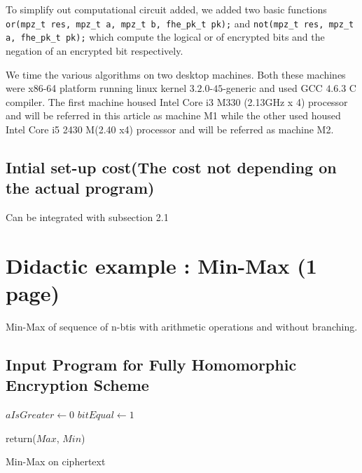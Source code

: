 \documentclass{acm_proc_article-sp}
\begin{document}
To simplify out computational circuit added, we added two basic functions \texttt{or(mpz\_t res, mpz\_t a, mpz\_t b, fhe\_pk\_t pk);} and \texttt{not(mpz\_t res, mpz\_t a, fhe\_pk\_t pk);} which compute the logical or of encrypted bits and the negation of an encrypted bit respectively.

We time the various algorithms on two desktop machines. Both these machines were x86-64 platform running linux kernel $3.2.0$-$45$-generic  and used GCC $4.6.3$ C compiler.  The first machine housed Intel Core i3 M330 (2.13GHz x 4) processor and will be referred in this article as machine M1 while the other used  housed Intel Core i5 2430 M(2.40 x4) processor and will be referred as machine M2.
 
\subsection{Intial set-up cost(The cost not depending on the actual program)}

Can be integrated with subsection 2.1 

\section{ Didactic example :  Min-Max (1 page)}
\label{sec:ex}
Min-Max of sequence of n-btis with arithmetic operations and without branching.
\subsection{Input Program for Fully Homomorphic Encryption Scheme}



\linesnumbered

\begin{algorithm}[H]

\SetVline



 $aIsGreater \leftarrow 0$\;
 $bitEqual \leftarrow 1$\;
	


return($Max$, $Min$)

 \caption{Min-Max on ciphertext \label{Code:algo}}


\end{algorithm}
\end{document}

